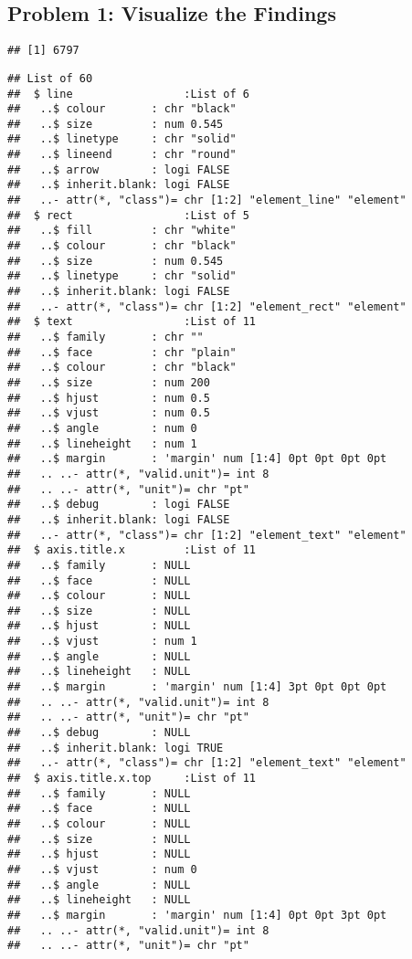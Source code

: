 \documentclass[]{article}
\begin{document}
\subsection{Problem 1: Visualize the
Findings}\label{problem-1-visualize-the-findings}

\begin{verbatim}
## [1] 6797
\end{verbatim}

\begin{verbatim}
## List of 60
##  $ line                 :List of 6
##   ..$ colour       : chr "black"
##   ..$ size         : num 0.545
##   ..$ linetype     : chr "solid"
##   ..$ lineend      : chr "round"
##   ..$ arrow        : logi FALSE
##   ..$ inherit.blank: logi FALSE
##   ..- attr(*, "class")= chr [1:2] "element_line" "element"
##  $ rect                 :List of 5
##   ..$ fill         : chr "white"
##   ..$ colour       : chr "black"
##   ..$ size         : num 0.545
##   ..$ linetype     : chr "solid"
##   ..$ inherit.blank: logi FALSE
##   ..- attr(*, "class")= chr [1:2] "element_rect" "element"
##  $ text                 :List of 11
##   ..$ family       : chr ""
##   ..$ face         : chr "plain"
##   ..$ colour       : chr "black"
##   ..$ size         : num 200
##   ..$ hjust        : num 0.5
##   ..$ vjust        : num 0.5
##   ..$ angle        : num 0
##   ..$ lineheight   : num 1
##   ..$ margin       : 'margin' num [1:4] 0pt 0pt 0pt 0pt
##   .. ..- attr(*, "valid.unit")= int 8
##   .. ..- attr(*, "unit")= chr "pt"
##   ..$ debug        : logi FALSE
##   ..$ inherit.blank: logi FALSE
##   ..- attr(*, "class")= chr [1:2] "element_text" "element"
##  $ axis.title.x         :List of 11
##   ..$ family       : NULL
##   ..$ face         : NULL
##   ..$ colour       : NULL
##   ..$ size         : NULL
##   ..$ hjust        : NULL
##   ..$ vjust        : num 1
##   ..$ angle        : NULL
##   ..$ lineheight   : NULL
##   ..$ margin       : 'margin' num [1:4] 3pt 0pt 0pt 0pt
##   .. ..- attr(*, "valid.unit")= int 8
##   .. ..- attr(*, "unit")= chr "pt"
##   ..$ debug        : NULL
##   ..$ inherit.blank: logi TRUE
##   ..- attr(*, "class")= chr [1:2] "element_text" "element"
##  $ axis.title.x.top     :List of 11
##   ..$ family       : NULL
##   ..$ face         : NULL
##   ..$ colour       : NULL
##   ..$ size         : NULL
##   ..$ hjust        : NULL
##   ..$ vjust        : num 0
##   ..$ angle        : NULL
##   ..$ lineheight   : NULL
##   ..$ margin       : 'margin' num [1:4] 0pt 0pt 3pt 0pt
##   .. ..- attr(*, "valid.unit")= int 8
##   .. ..- attr(*, "unit")= chr "pt"

\end{verbatim}
\end{document}
